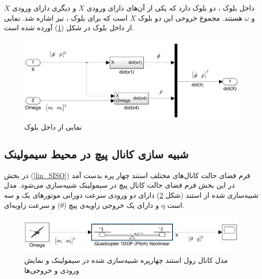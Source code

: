 داخل بلوک
،
دو بلوک دارد که یکی از آن‌های دارای ورودی $X$ و دیگری دارای ورودی $X$ و $\omega$ هستند. مجموع خروحی این دو بلوک $\dot X$ است که برای بلوک
،
نیز اشاره شد.
نمایی از داخل بلوک
در شکل (\ref{roll_all-six}) آورده شده است.
\begin{figure}[H]
	\includegraphics[width=16cm]{../Figures/QuadSimulation/roll_all-six.png}
	\centering
	\caption{نمایی از داخل بلوک }
	\label{roll_all-six}
\end{figure}

\subsection{شبیه سازی کانال پیچ در محیط سیمولینک}
در بخش
(\ref{lin_SISO})
فرم فضای حالت کانال‌های مختلف استند چهار پره بدست آمد در این بخش فرم فضای حالت کانال پیچ در سیمولینک شبیه‌سازی می‌شود.
مدل شبیه‌سازی شده از استند (شکل \ref{pitch_simulink}) دارای دو ورودی سرعت دورانی موتورهای یک و سه  و دارای یک خروجی زاویه‌ی پیچ ($\theta$) و  سرعت زاویه‌ای q است.
\begin{figure}[H]
	\includegraphics[width=16cm]{../Figures/QuadSimulation/pitch_Stand_Model.png}
	\centering
	\vspace*{-15mm}
	\caption{مدل کانال رول استند چهارپره شبیه‌سازی شده در سیمولینک و نمایش ورودی و خروجی‌ها}
	\label{pitch_simulink}
\end{figure}

